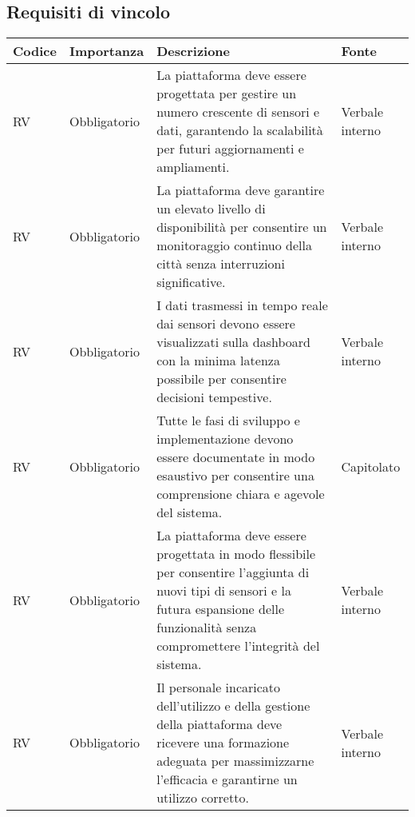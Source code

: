 \subsection{Requisiti di vincolo}
\setcounter{rowcounter}{0}
\begin{longtable}{|C{1cm}|C{2cm}|>{\raggedright}m{5cm}|C{2cm}|}
    \hline
    \textbf{Codice}                                & \textbf{Importanza} & \textbf{Descrizione}    & \textbf{Fonte}  \\
    \hline
    RV                          & Obbligatorio        &  La piattaforma deve essere progettata per gestire un numero crescente di sensori e dati, garantendo la scalabilità per futuri aggiornamenti e ampliamenti.  & Verbale interno                        \\
    \hline
     RV & Obbligatorio        &   La piattaforma deve garantire un elevato livello di disponibilità per consentire un monitoraggio continuo della città senza interruzioni significative. & Verbale interno                           \\
    \hline
     RV & Obbligatorio        &  I dati trasmessi in tempo reale dai sensori devono essere visualizzati sulla dashboard con la minima latenza possibile per consentire decisioni tempestive. & Verbale interno                            \\
    \hline
     RV & Obbligatorio        &  Tutte le fasi di sviluppo e implementazione devono essere documentate in modo esaustivo per consentire una comprensione chiara e agevole del sistema. & Capitolato                           \\
    \hline
     RV & Obbligatorio        &  La piattaforma deve essere progettata in modo flessibile per consentire l'aggiunta di nuovi tipi di sensori e la futura espansione delle funzionalità senza compromettere l'integrità del sistema. & Verbale interno                          \\
    \hline
     RV & Obbligatorio        &  Il personale incaricato dell'utilizzo e della gestione della piattaforma deve ricevere una formazione adeguata per massimizzarne l'efficacia e garantirne un utilizzo corretto. & Verbale interno                          \\
    \hline 
\end{longtable}



